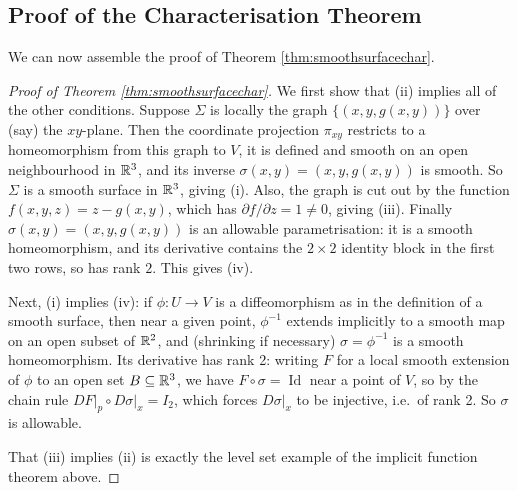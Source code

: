 \documentclass[a4paper]{scrartcl}
\begin{document}
\subsection{Proof of the Characterisation Theorem}

We can now assemble the proof of Theorem \ref{thm:smoothsurfacechar}.

\begin{proof}[Proof of Theorem \ref{thm:smoothsurfacechar}]
    We first show that (ii) implies all of the other conditions. Suppose $\Sigma$ is locally the graph $\{(x, y, g(x, y))\}$ over (say) the $xy$-plane. Then the coordinate projection $\pi_{xy}$ restricts to a homeomorphism from this graph to $V$, it is defined and smooth on an open neighbourhood in $\mathbb{R}^3$, and its inverse $\sigma(x, y) = (x, y, g(x, y))$ is smooth. So $\Sigma$ is a smooth surface in $\mathbb{R}^3$, giving (i). Also, the graph is cut out by the function $f(x, y, z) = z - g(x, y)$, which has $\partial f/\partial z = 1 \neq 0$, giving (iii). Finally $\sigma(x, y) = (x, y, g(x,y))$ is an allowable parametrisation: it is a smooth homeomorphism, and its derivative contains the $2 \times 2$ identity block in the first two rows, so has rank $2$. This gives (iv).

    Next, (i) implies (iv): if $\phi: U \rightarrow V$ is a diffeomorphism as in the definition of a smooth surface, then near a given point, $\phi^{-1}$ extends implicitly to a smooth map on an open subset of $\mathbb{R}^2$, and (shrinking if necessary) $\sigma = \phi^{-1}$ is a smooth homeomorphism. Its derivative has rank 2: writing $F$ for a local smooth extension of $\phi$ to an open set $B \subseteq \mathbb{R}^3$, we have $F \circ \sigma = \operatorname{Id}$ near a point of $V$, so by the chain rule $\left.DF\right|_p \circ \left.D\sigma\right|_x = I_2$, which forces $\left.D\sigma\right|_x$ to be injective, i.e.\ of rank 2. So $\sigma$ is allowable.

    That (iii) implies (ii) is exactly the level set example of the implicit function theorem above.


\end{proof}
\end{document}

